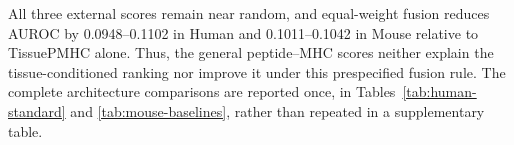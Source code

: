 All three external scores remain near random, and equal-weight fusion reduces AUROC by 0.0948--0.1102 in Human and 0.1011--0.1042 in Mouse relative to TissuePMHC alone. Thus, the general peptide--MHC scores neither explain the tissue-conditioned ranking nor improve it under this prespecified fusion rule. The complete architecture comparisons are reported once, in Tables~\ref{tab:human-standard} and \ref{tab:mouse-baselines}, rather than repeated in a supplementary table.
